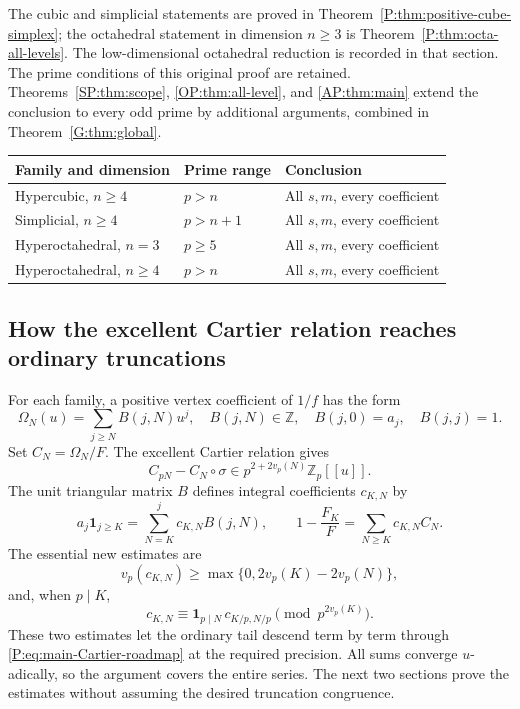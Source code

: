 \documentclass[11pt,a4paper]{article}
\theoremstyle{definition}\newtheorem{definition}[theorem]{Definition}
\theoremstyle{remark}\newtheorem{remark}[theorem]{Remark}
\numberwithin{equation}{section}
\begin{document}
The cubic and simplicial statements are proved in
Theorem~\ref{P:thm:positive-cube-simplex}; the octahedral statement
in dimension $n\ge3$ is Theorem~\ref{P:thm:octa-all-levels}.
The low-dimensional octahedral reduction is recorded in that section.
The prime conditions of this original proof are retained.
Theorems~\ref{SP:thm:scope}, \ref{OP:thm:all-level}, and
\ref{AP:thm:main} extend the conclusion to every odd prime by
additional arguments, combined in Theorem~\ref{G:thm:global}.

\begin{center}\small
\renewcommand{\arraystretch}{1.25}
\begin{tabular}{@{}p{}p{}p{}@{}}
\toprule
Family and dimension&Prime range&Conclusion\\ \midrule
Hypercubic, $n\ge4$&$p>n$&All $s,m$, every coefficient\\
Simplicial, $n\ge4$&$p>n+1$&All $s,m$, every coefficient\\
Hyperoctahedral, $n=3$&$p\ge5$&All $s,m$, every coefficient\\
Hyperoctahedral, $n\ge4$&$p>n$&All $s,m$, every coefficient\\
\bottomrule
\end{tabular}
\end{center}

\subsection{How the excellent Cartier relation reaches ordinary truncations}

For each family, a positive vertex coefficient of $1/f$ has the
form
\[
 \Omega_N(u)=\sum_{j\ge N}B(j,N)u^j,
 \quad B(j,N)\in\mathbb Z,\quad B(j,0)=a_j,\quad B(j,j)=1.
\]
Set $C_N=\Omega_N/F$. The excellent Cartier relation gives
\begin{equation}\label{P:eq:main-Cartier-roadmap}
 C_{pN}-C_N\circ\sigma\in
                p^{2+2v_p(N)}\mathbb Z_p[[u]].
\end{equation}
The unit triangular matrix $B$ defines integral coefficients
$c_{K,N}$ by
\[
 a_j\mathbf1_{j\ge K}=\sum_{N=K}^j c_{K,N}B(j,N),
 \qquad
 1-\frac{F_K}{F}=\sum_{N\ge K}c_{K,N}C_N.
\]
The essential new estimates are
\[
 v_p(c_{K,N})\ge\max\{0,2v_p(K)-2v_p(N)\},
\]
and, when $p\mid K$,
\[
 c_{K,N}\equiv\mathbf1_{p\mid N}\,c_{K/p,N/p}
                              \pmod{p^{2v_p(K)}}.
\]
These two estimates let the ordinary tail descend term by term
through \eqref{P:eq:main-Cartier-roadmap} at the required precision.
All sums converge $u$-adically, so the argument covers the entire
series. The next two sections prove the estimates without assuming
the desired truncation congruence.
\end{document}
